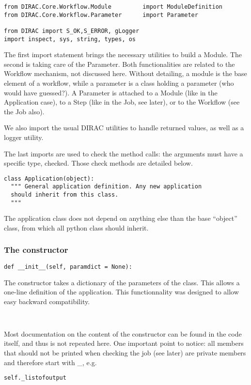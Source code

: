 \documentclass[a4paper,12pt]{article}
\begin{document}
\begin{lstlisting}[name=appli]
from DIRAC.Core.Workflow.Module         import ModuleDefinition
from DIRAC.Core.Workflow.Parameter      import Parameter

from DIRAC import S_OK,S_ERROR, gLogger
import inspect, sys, string, types, os
\end{lstlisting}

The first import statement brings the necessary utilities to build a Module. The
second is taking care of the Parameter. Both functionalities are related to the
Workflow mechanism, not discussed here. Without detailing, a module is the base
element of a workflow, while a parameter is a class holding a parameter (who
would have guessed?). A Parameter is attached to a Module (like in the
Application case), to a Step (like in the Job, see later), or to the Workflow
(see the Job also). 

We also import the usual DIRAC utilities to handle returned values, as well as a
logger utility.

The last imports are used to check the method calls: the arguments must have a
specific type, checked. Those check methods are detailed below.

\begin{lstlisting}[name=appli]
class Application(object):
  """ General application definition. Any new application 
  should inherit from this class.
  """
\end{lstlisting}
The application class does not depend on anything else than the base ``object''
class, from which all python class should inherit.

\subsubsection{The constructor}
\begin{lstlisting}[name=appli]
  def __init__(self, paramdict = None):
\end{lstlisting}
The constructor takes a dictionary of the parameters of the class. This allows a
one-line definition of the application. This functionnality was designed to
allow easy backward compatibility.

~

Most documentation on the content of the constructor can be found in the code
itself, and thus is not repeated here. One important point to notice: all members that 
should not be printed when checking the job (see later)
are private members and therefore start with \_, e.g. 
\begin{lstlisting}[firstnumber=53,belowskip=0.5cm]
    self._listofoutput
\end{lstlisting}
\end{document}
